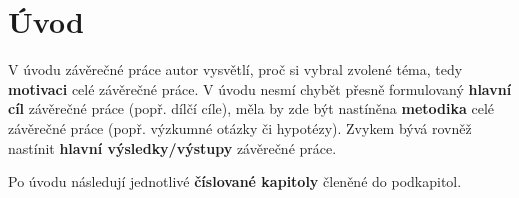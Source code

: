 \chapter*{Úvod}

V úvodu závěrečné práce autor vysvětlí, proč si vybral zvolené téma, tedy \textbf{motivaci} celé závěrečné práce. V úvodu nesmí chybět přesně formulovaný \textbf{hlavní cíl} závěrečné práce (popř. dílčí cíle), měla by zde být nastíněna \textbf{metodika} celé závěrečné práce (popř. výzkumné otázky či hypotézy). Zvykem bývá rovněž nastínit \textbf{hlavní výsledky/výstupy} závěrečné práce. 

Po úvodu následují jednotlivé \textbf{číslované kapitoly} členěné do podkapitol.
